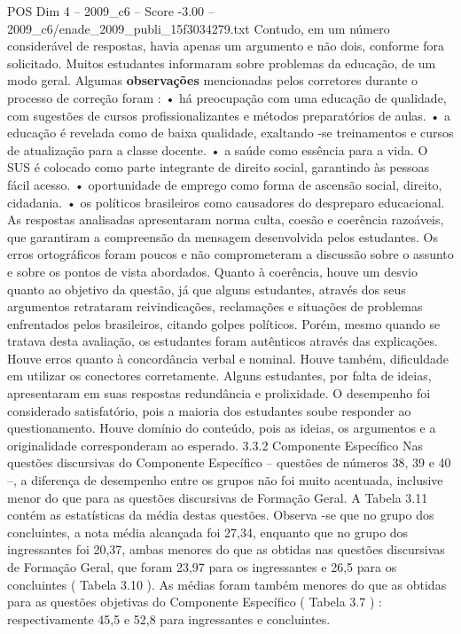 \begin{textsample}{POS Dim 4 – 2009\_c6 – Score -3.00 – 2009\_c6/enade\_2009\_publi\_15f3034279.txt}
Contudo, em um número considerável de respostas, havia apenas um argumento e não dois, conforme fora solicitado.
Muitos estudantes informaram sobre problemas da educação, de um modo geral.
Algumas \textbf{observações} mencionadas pelos corretores durante o processo de correção foram : • há preocupação com uma educação de qualidade, com sugestões de cursos profissionalizantes e métodos preparatórios de aulas. • a educação é revelada como de baixa qualidade, exaltando -se treinamentos e cursos de atualização para a classe docente. • a saúde como essência para a vida.
O SUS é colocado como parte integrante de direito social, garantindo às pessoas fácil acesso. • oportunidade de emprego como forma de ascensão social, direito, cidadania. • os políticos brasileiros como causadores do despreparo educacional.
As respostas analisadas apresentaram norma culta, coesão e coerência razoáveis, que garantiram a compreensão da mensagem desenvolvida pelos estudantes.
Os erros ortográficos foram poucos e não comprometeram a discussão sobre o assunto e sobre os pontos de vista abordados.
Quanto à coerência, houve um desvio quanto ao objetivo da questão, já que alguns estudantes, através dos seus argumentos retrataram reivindicações, reclamações e situações de problemas enfrentados pelos brasileiros, citando golpes políticos.
Porém, mesmo quando se tratava desta avaliação, os estudantes foram autênticos através das explicações.
Houve erros quanto à concordância verbal e nominal.
Houve também, dificuldade em utilizar os conectores corretamente.
Alguns estudantes, por falta de ideias, apresentaram em suas respostas redundância e prolixidade.
O desempenho foi considerado satisfatório, pois a maioria dos estudantes soube responder ao questionamento.
Houve domínio do conteúdo, pois as ideias, os argumentos e a originalidade corresponderam ao esperado. 3.3.2 Componente Específico Nas questões discursivas do Componente Específico – questões de números 38, 39 e 40 –, a diferença de desempenho entre os grupos não foi muito acentuada, inclusive menor do que para as questões discursivas de Formação Geral.
A Tabela 3.11 contém as estatísticas da média destas questões.
Observa -se que no grupo dos concluintes, a nota média alcançada foi 27,34, enquanto que no grupo dos ingressantes foi 20,37, ambas menores do que as obtidas nas questões discursivas de Formação Geral, que foram 23,97 para os ingressantes e 26,5 para os concluintes ( Tabela 3.10 ).
As médias foram também menores do que as obtidas para as questões objetivas do Componente Específico ( Tabela 3.7 ) : respectivamente 45,5 e 52,8 para ingressantes e concluintes.

\end{textsample}
